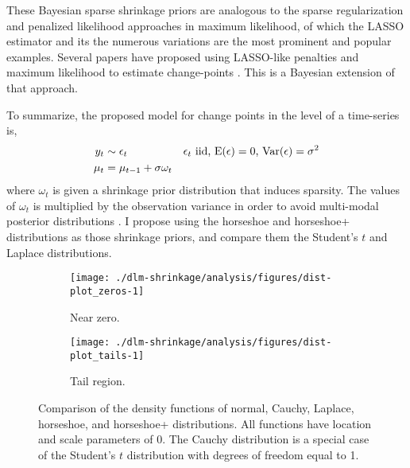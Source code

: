These Bayesian sparse shrinkage priors are analogous to the sparse regularization and penalized likelihood approaches in maximum likelihood, of which the LASSO estimator \parencite{Tibshirani1996} and its the numerous variations are the most prominent and popular examples.
Several papers have proposed using LASSO-like penalties and maximum likelihood to estimate change-points \parencites{TibshiraniEtAl2005}{HarchaouiLevy-Leduc2010}{ChanYauZhang2014}.
This is a Bayesian extension of that approach.

To summarize, the proposed model for change points in the level of a time-series is,
\begin{align}
  \label{dlm:eq:16}
  y_{t} & \sim \epsilon_{t} & \text{$\epsilon_{t}$ iid, $\operatorname{E}(\epsilon) = 0$, $\operatorname{Var}(\epsilon) = \sigma^{2}$} \\
  \mu_{t} &= \mu_{t - 1} + \sigma \omega_{t}
\end{align}
where $\omega_{t}$ is given a shrinkage prior distribution that induces sparsity.
The values of $\omega_{t}$ is multiplied by the observation variance in order to avoid multi-modal posterior distributions \parencite[8]{PolsonScott2010}.
I propose using the horseshoe and horseshoe+ distributions as those shrinkage priors, and compare them the Student's $t$ and Laplace distributions.

\begin{figure}[!htpb]
 \begin{subfigure}[b]{\linewidth}
   \texttt{[image: ./dlm-shrinkage/analysis/figures/dist-plot\_zeros-1]}
   \caption{Near zero.}
 \end{subfigure}
 \begin{subfigure}[b]{\linewidth}
    \texttt{[image: ./dlm-shrinkage/analysis/figures/dist-plot\_tails-1]}
    \caption{Tail region.}
 \end{subfigure}
  \caption[Comparison of the density functions of normal, Cauchy, Laplace, horseshoe, and horseshoe+ distributions.]{
    Comparison of the density functions of normal, Cauchy, Laplace, horseshoe, and horseshoe+ distributions.
    All functions have location and scale parameters of 0.
    The Cauchy distribution is a special case of the Student's $t$ distribution with degrees of freedom equal to 1.
  }
  \label{dlm:fig:density}
\end{figure}


